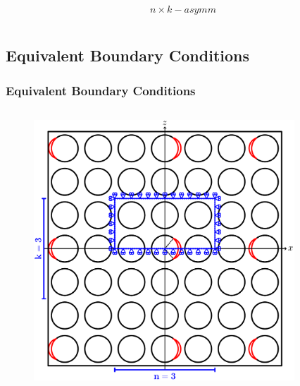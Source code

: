 \documentclass[first,firstsupp,lastsupp,last,hyperref,table]{ETHclass}
\begin{document}
\begin{frame}
\begin{columns}[c]
\begin{column}{0.5\textwidth}
\begin{figure}
\end{figure}
\vspace{-0.25cm}
\begin{equation*}
n\times k-asymm
\end{equation*}
\end{column}
\end{columns}
\end{frame}

\subsection{Equivalent Boundary Conditions}

\begin{frame}
\frametitle{\small Equivalent Boundary Conditions}
\vspace{-1cm}
\centering
\begin{columns}[t]
\begin{column}{0.5\textwidth}
\centering
\begin{figure}
\centering
\includegraphics[width=0.75\columnwidth]{coupling.pdf}
\end{figure}
\end{column}
\begin{column}{0.5\textwidth}
\centering
\begin{figure}
\centering

\end{figure}
\end{column}
\end{columns}
\end{frame}
\end{document}
